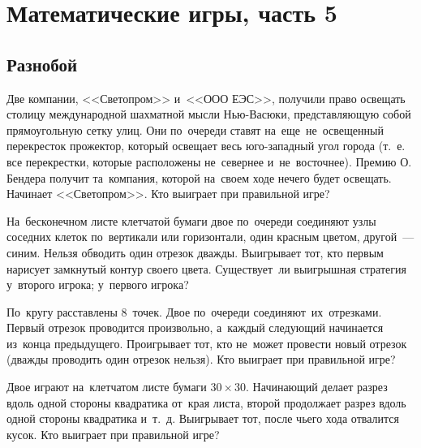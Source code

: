 

\section*{Математические игры, часть 5}



\subsection*{Разнобой}

\begin{problems}


\item
Две компании, <<Светопром>> и~<<ООО ЕЭС>>, получили право освещать столицу
международной шахматной мысли Нью-Васюки, представляющую собой прямоугольную
сетку улиц.
Они по~очереди ставят на~еще~не~освещенный перекресток прожектор, который
освещает весь юго-западный угол города
(т.~е. все перекрестки, которые расположены не~севернее и~не~восточнее).
Премию О.\,Бендера получит та~компания, которой на~своем ходе нечего будет
освещать.
Начинает <<Светопром>>.
Кто выиграет при правильной игре?

\item
На~бесконечном листе клетчатой бумаги двое по~очереди соединяют узлы соседних
клеток по~вертикали или горизонтали, один красным цветом, другой~--- синим.
Нельзя обводить один отрезок дважды.
Выигрывает тот, кто первым нарисует замкнутый контур своего цвета.
Существует~ли выигрышная стратегия
\quad
\sbp у~второго игрока;
\quad
\sbp у~первого игрока?

\item
По~кругу расставлены 8~точек.
Двое по~очереди соединяют~их~отрезками.
Первый отрезок проводится произвольно, а~каждый следующий начинается из~конца
предыдущего.
Проигрывает тот, кто не~может провести новый отрезок
(дважды проводить один отрезок нельзя).
Кто выиграет при правильной игре?

\item
Двое играют на~клетчатом листе бумаги $30 \times 30$.
Начинающий делает разрез вдоль одной стороны квадратика от~края листа,
второй продолжает разрез вдоль одной стороны квадратика и~т.~д.
Выигрывает тот, после чьего хода отвалится кусок.
Кто выиграет при правильной игре?


\end{problems}
